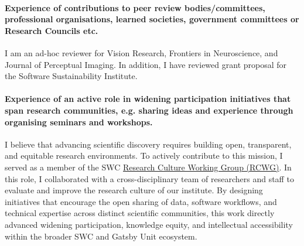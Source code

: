 \documentclass{article}
\begin{document}
\paragraph{Experience of contributions to peer review bodies/committees, professional
organisations, learned societies, government committees or Research Councils etc.}

I am an ad-hoc reviewer for Vision Research, Frontiers in Neuroscience, and Journal
of Perceptual Imaging. In addition, I have reviewed grant proposal for the
Software Sustainability Institute.

\paragraph{Experience of an active role in widening participation initiatives
that span research communities, e.g. sharing ideas and experience through
organising seminars and workshops.}

I believe that advancing scientific discovery requires building open,
transparent, and equitable research environments. To actively contribute to
this mission, I served as a member of the SWC
\href{https://sainsburywellcomecentre.github.io/RCWG/}{Research Culture Working
Group (RCWG)}.
%
In this role, I collaborated with a cross-disciplinary team of researchers and
staff to evaluate and improve the research culture of our institute. By
designing initiatives that encourage the open sharing of data, software
workflows, and technical expertise across distinct scientific communities, this
work directly advanced widening participation, knowledge equity, and
intellectual accessibility within the broader SWC and Gatsby Unit ecosystem.



\end{document}
